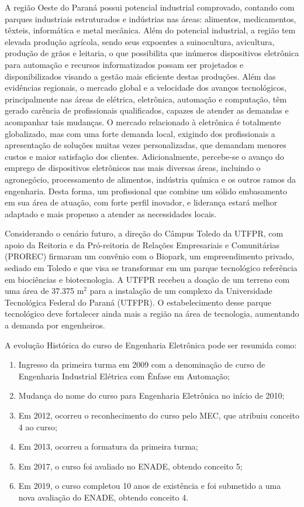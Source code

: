 A região Oeste do Paraná possui potencial industrial comprovado, contando com parques industriais estruturados e indústrias nas áreas: alimentos, medicamentos, têxteis, informática e metal mecânica. Além do potencial industrial, a região tem elevada produção agrícola, sendo seus expoentes a suinocultura, avicultura, produção de grãos e leitaria, o que possibilita que inúmeros dispositivos eletrônica para automação e recursos informatizados possam ser projetados e disponibilizados visando a gestão mais eficiente destas produções. Além das evidências regionais, o mercado global e a velocidade dos avanços tecnológicos, principalmente nas áreas de elétrica, eletrônica, automação e computação, têm gerado carência de profissionais qualificados, capazes de atender as demandas e acompanhar tais mudanças. O mercado relacionado à eletrônica é totalmente globalizado, mas com uma forte demanda local, exigindo dos profissionais a apresentação de soluções muitas vezes personalizadas, que demandam menores custos e maior satisfação dos clientes. Adicionalmente, percebe-se o avanço do emprego de dispositivos eletrônicos nas mais diversas áreas, incluindo o agronegócio, processamento de alimentos, indústria química e os outros ramos da engenharia. Desta forma, um profissional que combine um sólido embasamento em sua área de atuação, com forte perfil inovador, e liderança estará melhor adaptado e mais propenso a atender as necessidades locais.

Considerando o cenário futuro, a direção do Câmpus Toledo da UTFPR, com apoio da Reitoria e da Pró-reitoria de Relações Empresariais e Comunitárias (PROREC) firmaram um convênio com o Biopark, um empreendimento privado, sediado em Toledo e que visa se transformar em um parque tecnológico referência em biociências e biotecnologia. A UTFPR recebeu a doação de um terreno com uma área de 37.375 m$^2$ para a instalação de um complexo da Universidade Tecnológica Federal do Paraná (UTFPR). O estabelecimento desse parque tecnológico deve fortalecer ainda mais a região na área de tecnologia, aumentando a demanda por engenheiros. 


A evolução Histórica do curso de Engenharia Eletrônica pode ser resumida como:

\begin{enumerate}
	\item 	Ingresso da primeira turma em 2009 com a denominação de curso de Engenharia Industrial Elétrica com Ênfase em Automação;
	\item 	Mudança do nome do curso para Engenharia Eletrônica no início de 2010;
	\item	Em 2012, ocorreu o reconhecimento do curso pelo MEC, que atribuiu conceito 4 ao curso;
	\item	Em 2013, ocorreu a formatura da primeira turma;
	\item	Em 2017, o curso foi avaliado no ENADE, obtendo conceito 5;
	\item	Em 2019, o curso completou 10 anos de existência e foi submetido a uma nova avaliação do ENADE, obtendo conceito 4.
\end{enumerate}

